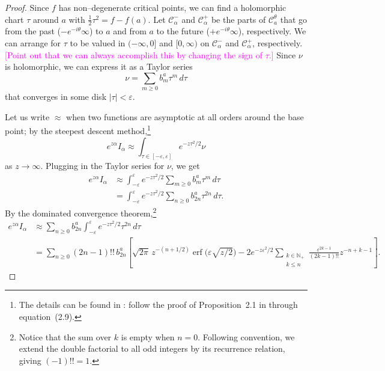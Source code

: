 \documentclass{article}
\theoremstyle{definition}
\theoremstyle{plain}
\begin{document}
\begin{proof}
Since $f$ has non--degenerate critical points, we can find a holomorphic chart $\tau$ around $a$ with $\tfrac{1}{2} \tau^2 = f - f(a)$. Let $\mathcal{C}^-_\alpha$ and $\mathcal{C}^+_\alpha$ be the parts of $\mathcal{C}_a^\theta$ that go from the past ($-e^{-i\theta}\infty$) to $a$ and from $a$ to the future ($+e^{-i\theta}\infty$), respectively. We can arrange for $\tau$ to be valued in $(-\infty, 0]$ and $[0,\infty)$ on $\mathcal{C}^-_\alpha$ and $\mathcal{C}^+_\alpha$, respectively. \textcolor{magenta}{[Point out that we can always accomplish this by changing the sign of $\tau$.]} Since $\nu$ is holomorphic, we can express it as a Taylor series
\[ \nu = \sum_{m \ge 0} b_m^a \tau^m\,d\tau \]
that converges in some disk $|\tau| < \varepsilon$.

Let us write $\approx$ when two functions are asymptotic at all orders around the base point; by the steepest descent method,\footnote{The details can be found in \cite{miller2006applied}: follow the proof of Proposition~2.1 in through equation~(2.9).}
\[ e^{z \alpha} I_\alpha \approx \int_{\tau \in [-\varepsilon, \varepsilon]} e^{-z\tau^2/2} \nu \]
as $z \to \infty$. Plugging in the Taylor series for $\nu$, we get
\begin{align*}
e^{z \alpha} I_\alpha & \approx \int_{-\varepsilon}^\varepsilon e^{-z\tau^2/2} \sum_{m \ge 0} b_m^a \tau^m\,d\tau \\
& = \int_{-\varepsilon}^\varepsilon e^{-z\tau^2/2} \sum_{n \ge 0} b_{2n}^a \tau^{2n}\,d\tau.
\end{align*}
By the dominated convergence theorem,\footnote{Notice that the sum over $k$ is empty when $n = 0$. Following convention, we extend the double factorial to all odd integers by its recurrence relation, giving $(-1)!! = 1$.}
\begin{align*}
e^{z \alpha} I_\alpha & \approx \sum_{n \ge 0} b_{2n}^a \int_{-\varepsilon}^\varepsilon e^{-z\tau^2/2} \tau^{2n}\,d\tau \\
& = \sum_{n \ge 0} (2n-1)!!\,b_{2n}^a \left[ \sqrt{2\pi}\,z^{-(n+1/2)} \operatorname{erf}\big(\varepsilon \sqrt{z/2}\big) - 2e^{-z\varepsilon^2/2} \sum_{\substack{k \in \mathbb{N}_+ \\ k \le n}} \frac{\varepsilon^{2k-1}}{(2k-1)!!} z^{-n+k-1} \right].
\end{align*}


\end{proof}
\end{document}
